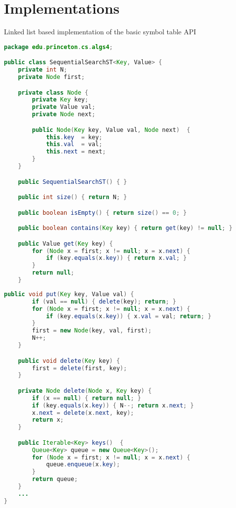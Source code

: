 \documentclass[8pt,a4paper,compress]{beamer}
\begin{document}
\section{Implementations}
\begin{frame}[fragile]
Linked list based implementation of the basic symbol table API

\begin{lstlisting}[language=Java]
package edu.princeton.cs.algs4;

public class SequentialSearchST<Key, Value> {
    private int N; 
    private Node first; 

    private class Node {
        private Key key;
        private Value val;
        private Node next;

        public Node(Key key, Value val, Node next)  {
            this.key  = key;
            this.val  = val;
            this.next = next;
        }
    }

    public SequentialSearchST() { }

    public int size() { return N; }

    public boolean isEmpty() { return size() == 0; }

    public boolean contains(Key key) { return get(key) != null; }

    public Value get(Key key) {
        for (Node x = first; x != null; x = x.next) {
            if (key.equals(x.key)) { return x.val; }
        }
        return null;
    }
\end{lstlisting}
\end{frame}

\begin{frame}[fragile]
\begin{lstlisting}[language=Java]
    public void put(Key key, Value val) {
        if (val == null) { delete(key); return; }
        for (Node x = first; x != null; x = x.next) {
            if (key.equals(x.key)) { x.val = val; return; }
        }
        first = new Node(key, val, first);
        N++;
    }

    public void delete(Key key) {
        first = delete(first, key);
    }

    private Node delete(Node x, Key key) {
        if (x == null) { return null; }
        if (key.equals(x.key)) { N--; return x.next; }
        x.next = delete(x.next, key);
        return x;
    }

    public Iterable<Key> keys()  {
        Queue<Key> queue = new Queue<Key>();
        for (Node x = first; x != null; x = x.next) {
            queue.enqueue(x.key);
        }
        return queue;
    }
    ...
}
\end{lstlisting}
\end{frame}
\end{document}
